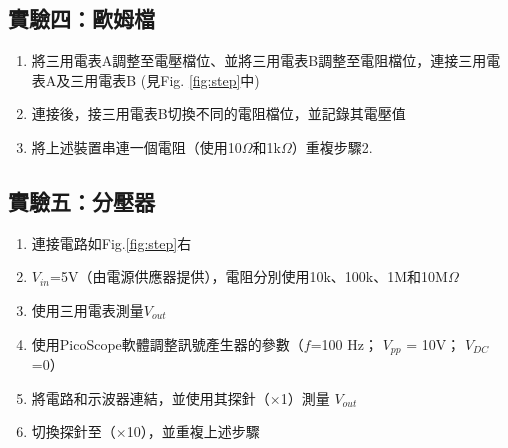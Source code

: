 \documentclass[12pt,a4paper]{article}
\begin{document}
\begin{CJK}{UTF8}{bkai}
\subsection{實驗四：歐姆檔}\label{subsec:step_4}

\begin{enumerate}
    \item 將三用電表A調整至電壓檔位、並將三用電表B調整至電阻檔位，連接三用電表A及三用電表B (見Fig. \ref{fig:step}中)
    \item 連接後，接三用電表B切換不同的電阻檔位，並記錄其電壓值
    \item 將上述裝置串連一個電阻（使用10$\Omega$和1k$\Omega$）重複步驟2.
\end{enumerate}

\subsection{實驗五：分壓器}\label{subsec:step_5}

\begin{enumerate}
    \item 連接電路如Fig.\ref{fig:step}右
    \item $V_{in}$=5V（由電源供應器提供），電阻分別使用10k、100k、1M和10M$\Omega$
    \item 使用三用電表測量$V_{out}$
    \item 使用PicoScope軟體調整訊號產生器的參數（$f$=100 Hz； $V_{pp}$ = 10V； $V_{DC}$=0）
    \item 將電路和示波器連結，並使用其探針（$\times$1）測量 $V_{out}$
    \item 切換探針至（$\times$10），並重複上述步驟
\end{enumerate}



\end{CJK}
\end{document}
